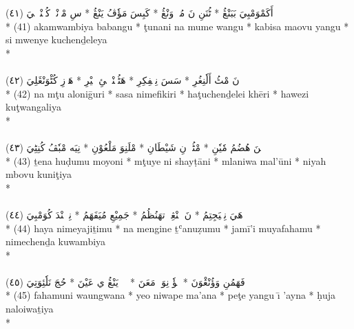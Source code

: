 \documentclass[a4paper, 12pt]{report}
\begin{document}
\begin{center}
\textarabic{(٤١) \textcolor{mygreen}{أَكَمْوَمْبِيَ بَبَنْڠُ  * ٹُنَنِ نَ مُمٖ وَنْڠُ  * كَبِسَ مَؤٗڤُ يَنْڠُ  * سِ مْوٖنْيٖ كُچٖنْدٖلٖيَ }} \\* 
(41) akamwambiya babangu  * ţunani na mume wangu  * kabisa maovu yangu  * si mwenye kuchenḏeleya  \\* 
 \\ 
\\[8mm] 

\textarabic{(٤٢) \textcolor{mygreen}{نَ مْٹُ أَلٗنِغُرِ  * سَسَ نِمٖفِكِرِ  * هَٹُچٖنْدٖلٖئِ خٖيْرِ  * هَوٖزِ كُٹْوَنْڠَلِيَ }} \\* 
(42) na mţu aloniḡuri  * sasa nimefikiri  * haţuchenḏelei khēri  * hawezi kuţwangaliya  \\* 
 \\ 
\\[8mm] 

\textarabic{(٤٣) \textcolor{mygreen}{تٖنَ هُضُمُ مٗيٗنِ  * مْٹُيٖ نِ شَيْطَانِ  * مْلَنِوَ مَلْعُوْنِ  * نِيَه مْبٗڤُ كُنِٹِيَ }} \\* 
(43) ṯena huḍumu moyoni  * mţuye ni shayṭāni  * mlaniwa mal'ūni  * niyah mbovu kuniţiya  \\* 
 \\ 
\\[8mm] 

\textarabic{(٤٤) \textcolor{mygreen}{هَيَ نِمٖيَجِتِمُ  * نَ مٖنْڠِنٖ تهَنُظُمُ  * جَمِيْعِ مُيَفَهَمُ  * نِمٖچٖنْدَ كُوَمْبِيَ }} \\* 
(44) haya nimeyajiṯimu  * na mengine ṯʿanuẓumu  * jamī'i muyafahamu  * nimechenḏa kuwambiya  \\* 
 \\ 
\\[8mm] 

\textarabic{(٤٥) \textcolor{mygreen}{فَهَمُنِ وَؤُنْڠْوَنَ  * يٖؤٗ نِوَپٖ مَعَنَ  * پٖٹٖ يَنْڠُ ي عَيْنَ  * حُجَ نَلٗئِوَتِيَ }} \\* 
(45) fahamuni waungwana  * yeo niwape ma'ana  * peţe yangu ı̄ 'ayna  * ḥuja naloiwaṯiya  \\* 
 \\ 
\\[8mm] 


\end{center}
\end{document}
